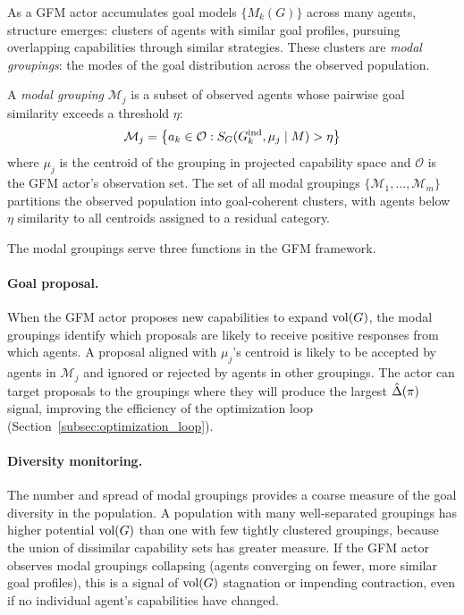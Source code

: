 As a GFM actor accumulates goal models $\{M_k(G)\}$ across many agents, structure emerges: clusters of agents with similar goal profiles, pursuing overlapping capabilities through similar strategies. These clusters are \emph{modal groupings}: the modes of the goal distribution across the observed population.

\begin{definition}
\label{def:modal_grouping}
A \emph{modal grouping} $\mathcal{M}_j$ is a subset of observed agents whose pairwise goal similarity exceeds a threshold $\eta$:
\begin{equation}
\label{eq:modal_grouping}
\mathcal{M}_j = \bigl\{a_k \in \mathcal{O} : S_G(G_{k}^{\mathrm{ind}}, \mu_j \mid M) > \eta\bigr\}
\end{equation}
where $\mu_j$ is the centroid of the grouping in projected capability space and $\mathcal{O}$ is the GFM actor's observation set. The set of all modal groupings $\{\mathcal{M}_1, \ldots, \mathcal{M}_m\}$ partitions the observed population into goal-coherent clusters, with agents below $\eta$ similarity to all centroids assigned to a residual category.
\end{definition}

The modal groupings serve three functions in the GFM framework.

\paragraph{Goal proposal.} When the GFM actor proposes new capabilities to expand $\operatorname{vol}(G)$, the modal groupings identify which proposals are likely to receive positive responses from which agents. A proposal aligned with $\mu_j$'s centroid is likely to be accepted by agents in $\mathcal{M}_j$ and ignored or rejected by agents in other groupings. The actor can target proposals to the groupings where they will produce the largest $\hat{\Delta}(\pi)$ signal, improving the efficiency of the optimization loop (Section~\ref{subsec:optimization_loop}).

\paragraph{Diversity monitoring.} The number and spread of modal groupings provides a coarse measure of the goal diversity in the population. A population with many well-separated groupings has higher potential $\operatorname{vol}(G)$ than one with few tightly clustered groupings, because the union of dissimilar capability sets has greater measure. If the GFM actor observes modal groupings collapsing (agents converging on fewer, more similar goal profiles), this is a signal of $\operatorname{vol}(G)$ stagnation or impending contraction, even if no individual agent's capabilities have changed.

